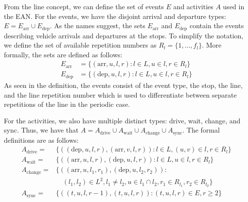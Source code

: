 \documentclass[english, 12pt, a4paper, sci, utf8, a-2b, online]{aaltothesis}
\newtheorem{definition}{Definition}
\newcommand{\Earr}{E_\text{arr}}
\newcommand{\Edep}{E_\text{dep}}
\newcommand{\Async}{A_\text{sync}}
\begin{document}
From the line concept, we can define the set of events $E$ and activities $A$ used in the EAN.
For the events, we have the disjoint arrival and departure types: $E = \Earr \cup \Edep$. As the names suggest, the sets $\Earr$ and $\Edep$ contain the events describing vehicle arrivals and departures at the stops. To simplify the notation, we define the set of available repetition numbers as $R_l = \{1, \dots, f_l\}$. More formally, the sets are defined as follows:
\begin{align*}
    \Earr &= \{
        (\text{arr}, u, l, r) : l \in L, u \in l, r \in R_l
    \} \\
    \Edep &= \{
        (\text{dep}, u, l, r) : l \in L, u \in l, r \in R_l
    \}
\end{align*}
As seen in the definition, the events consist of the event type, the stop, the line, and the line repetition number which is used to differentiate between separate repetitions of the line in the periodic case.

For the activities, we also have multiple distinct types: drive, wait, change, and sync. Thus, we have that $A = A_\text{drive} \cup A_\text{wait} \cup A_\text{change} \cup \Async$. The formal definitions are as follows:
\begin{align*}
    A_\text{drive} =& \{(
        (\text{dep}, u, l, r),
        (\text{arr}, v, l, r)
    ): l \in L, (u, v) \in l, r \in R_l\}\\
    A_\text{wait} =& \{(
        (\text{arr}, u, l, r),
        (\text{dep}, u, l, r)
    ): l \in L, u \in l, r \in R_l\} \\
    A_\text{change} =& \{(
        (\text{arr}, u, l_1, r_1),
        (\text{dep}, u, l_2, r_2)
    ): \\&\quad (l_1, l_2) \in L^2, l_1 \neq l_2, u \in l_1 \cap l_2, r_1 \in R_{l_1}, r_2 \in R_{l_2}\} \\
    \Async =& \{(
       (t, u, l, r-1),
       (t, u, l, r)
    ): (t, u, l, r) \in E, r \geq 2 \}
\end{align*}
\end{document}
